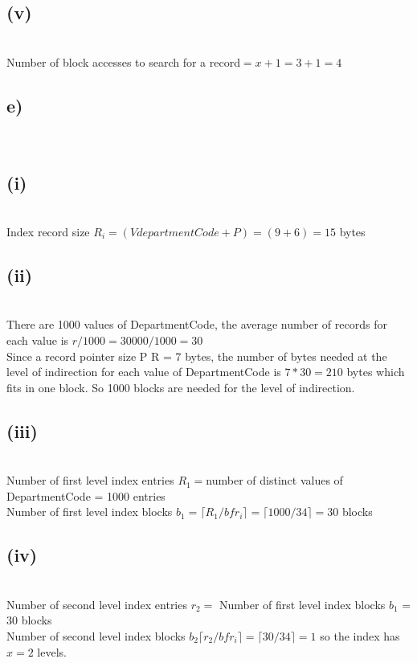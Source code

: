 \documentclass[11pt]{article}
\theoremstyle{plain}
\theoremstyle{definition}
\begin{document}
\subsection*{(v)}\\
Number of block accesses to search for a record$ = x + 1 = 3 + 1 = 4$
\\

\subsection*{e)}\\
\subsection*{(i)}\\
Index record size $R_i = (V departmentCode + P) = (9+6) = 15 $ bytes
\subsection*{(ii)}\\
	There are 1000 values of DepartmentCode, the average number of records for each value is $r/1000 = 30000 / 1000 = 30$ \\

	Since a record pointer size P R = 7 bytes, the number of bytes needed at the level of indirection for each value of DepartmentCode is $7 * 30 = 210 $ bytes which fits in one block. So 1000 blocks are needed for the level of indirection.\\
\subsection*{(iii)}\\
Number of first level index entries $R_1 = $number of distinct values of DepartmentCode = 1000 entries\\
Number of first level index blocks $b_1 = \lceil R_1 / bfr_i \rceil  = \lceil 1000/34 \rceil = 30$ blocks\\
\subsection*{(iv)}\\
Number of second level index entries $r_2 = $ Number of first level index blocks $b_1$ = 30 blocks \\
Number of second level index blocks $b_2 \lceil r_2 /bfr_i \rceil = \lceil 30/34 \rceil = 1$ so the index has $x = 2$ levels.\\
\end{document}
